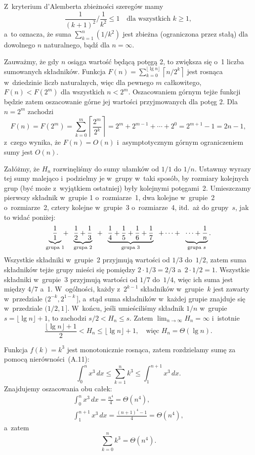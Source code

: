 
\exercise %
Z~kryterium d'Alemberta zbieżności szeregów mamy
\[
	\frac{1}{(k+1)^2}\bigg/\frac{1}{k^2} \le 1 \quad\text{dla wszystkich $k\ge1$},
\]
a~to oznacza, że suma $\sum_{k=1}^n(1/k^2)$ jest zbieżna (ograniczona przez stałą) dla dowolnego $n$ naturalnego, bądź dla $n=\infty$.

\exercise %
Zauważmy, że gdy $n$ osiąga wartość będącą potęgą 2, to zwiększa się o~1 liczba sumowanych składników. Funkcja $F(n)=\sum_{k=0}^{\lfloor\lg n\rfloor}\left\lceil n/2^k\right\rceil$ jest rosnąca w~dziedzinie liczb naturalnych, więc dla pewnego $m$ całkowitego, $F(n)<F(2^m)$ dla wszystkich $n<2^m$. Oszacowaniem górnym tejże funkcji będzie zatem oszacowanie górne jej wartości przyjmowanych dla potęg 2. Dla $n=2^m$ zachodzi
\[
	F(n) = F(2^m) = \sum_{k=0}^m\left\lceil\frac{2^m}{2^k}\right\rceil = 2^m+2^{m-1}+\cdots+2^0 = 2^{m+1}-1 = 2n-1,
\]
z~czego wynika, że $F(n)=O(n)$ i~asymptotycznym górnym ograniczeniem sumy jest $O(n)$.

\exercise %
Załóżmy, że $H_n$ rozwinęliśmy do sumy ułamków od $1/1$ do $1/n$. Ustawmy wyrazy tej sumy malejąco i~podzielmy je w~grupy w~taki sposób, by rozmiary kolejnych grup (być może z~wyjątkiem ostatniej) były kolejnymi potęgami~2. Umieszczamy pierwszy składnik w~grupie 1 o~rozmiarze~1, dwa kolejne w~grupie~2 o~rozmiarze~2, cztery kolejne w~grupie~3 o~rozmiarze~4, itd.\ aż do grupy~$s$, jak to widać poniżej:
\[
	\underbrace{\frac{1}{1}}_{\text{\scriptsize grupa 1}}\!\!+\;\;\underbrace{\frac{1}{2}+\frac{1}{3}}_{\text{\scriptsize grupa 2}}\;\;+\;\;\underbrace{\frac{1}{4}+\frac{1}{5}+\frac{1}{6}+\frac{1}{7}}_{\text{\scriptsize grupa 3}}\;\;+\cdots+\;\;\underbrace{\cdots +\frac{1}{n}}_{\text{\scriptsize grupa $s$}}.
\]
Wszystkie składniki w~grupie~2 przyjmują wartości od $1/3$ do~$1/2$, zatem suma składników tejże grupy mieści się pomiędzy $2\cdot1/3=2/3$ a~$2\cdot1/2=1$. Wszystkie składniki w~grupie~3 przyjmują wartości od $1/7$ do~$1/4$, więc ich suma jest między $4/7$ a~1. W~ogólności, każdy z~$2^{k-1}$ składników w~grupie~$k$ jest zawarty w~przedziale $\bigl(2^{-k},2^{1-k}\,\bigr]$, a~stąd suma składników w~każdej grupie znajduje się w~przedziale $(1/2,1\,]$. W~końcu, jeśli umieściliśmy składnik $1/n$ w~grupie $s = \lfloor\lg n\rfloor+1$, to zachodzi $s/2<H_n\le s$. Zatem $\lim_{n\to\infty}H_n=\infty$ i~istotnie
\[
	\frac{\lfloor\lg n\rfloor+1}{2} < H_n \le \lfloor\lg n\rfloor+1, \quad\text{więc $H_n=\Theta(\lg n)$}.
\]

\exercise %
Funkcja $f(k)=k^3$ jest monotonicznie rosnąca, zatem rozdzielamy sumę za pomocą nierówności~(A.11):
\[
	\int_0^nx^3\,dx \le \sum_{k=1}^nk^3 \le \int_1^{n+1}x^3\,dx.
\]
Znajdujemy oszacowania obu całek:
\begin{gather*}
	\int_0^nx^3\,dx = \frac{n^4}{4} = \Theta(n^4), \\[2mm]
	\int_1^{n+1}x^3\,dx = \frac{(n+1)^4-1}{4} = \Theta(n^4),
\end{gather*}
a~zatem
\[
	\sum_{k=0}^nk^3 = \Theta(n^4).
\]

